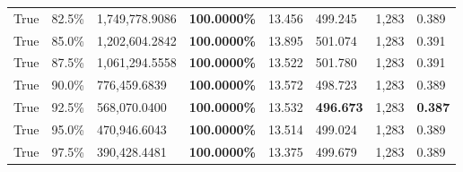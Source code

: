 \begin{table}[H]
\begin{tabular}{lllrllll}
\cline{1-8}
True & 82.5\% & 1,749,778.9086 & \bfseries \color{red} 100.0000\% & 13.456 & 499.245 & 1,283 & 0.389 \\
\cline{1-8}
True & 85.0\% & 1,202,604.2842 & \bfseries \color{red} 100.0000\% & 13.895 & 501.074 & 1,283 & 0.391 \\
\cline{1-8}
True & 87.5\% & 1,061,294.5558 & \bfseries \color{red} 100.0000\% & 13.522 & 501.780 & 1,283 & 0.391 \\
\cline{1-8}
True & 90.0\% & 776,459.6839 & \bfseries \color{red} 100.0000\% & 13.572 & 498.723 & 1,283 & 0.389 \\
\cline{1-8}
True & 92.5\% & 568,070.0400 & \bfseries \color{red} 100.0000\% & 13.532 & \bfseries \color{red} 496.673 & 1,283 & \bfseries \color{red} 0.387 \\
\cline{1-8}
True & 95.0\% & 470,946.6043 & \bfseries \color{red} 100.0000\% & 13.514 & 499.024 & 1,283 & 0.389 \\
\cline{1-8}
True & 97.5\% & 390,428.4481 & \bfseries \color{red} 100.0000\% & 13.375 & 499.679 & 1,283 & 0.389 \\
\cline{1-8}
\bottomrule
\end{tabular}
\end{table}
